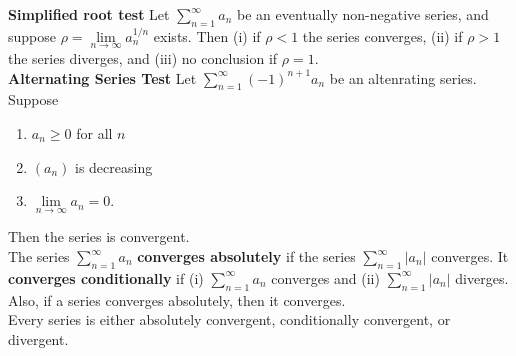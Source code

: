 \documentclass[10pt,landscape]{article}
\begin{document}
\begin{multicols}{3}
\textbf{Simplified root test} Let  $\sum_{n=1}^\infty a_n$ be an eventually non-negative series, and suppose  $\rho=\lim\limits_{n\to\infty} a_n^{1/n}$ exists. Then (i) if  $\rho<1$ the series converges, (ii) if  $\rho>1$ the series diverges, and (iii) no conclusion if $\rho=1$.\\
\textbf{Alternating Series Test} Let $\sum_{n=1}^\infty(-1)^{n+1}a_n$ be an altenrating series. Suppose
 \begin{enumerate}
	 \item $a_n\geq 0$ for all  $n$
	\item  $(a_n)$ is decreasing
	\item $\lim\limits_{n\to\infty}a_n=0$.
\end{enumerate} Then the series is convergent.\\
The series $\sum_{n=1}^\infty a_n$ \textbf{converges absolutely} if the series  $\sum_{n=1}^\infty|a_n|$ converges. It \textbf{converges conditionally} if (i)  $\sum_{n=1}^\infty a_n$ converges and (ii)  $\sum_{n=1}^\infty|a_n|$ diverges. Also, if a series converges absolutely, then it converges.\\
Every series is either absolutely convergent, conditionally convergent, or divergent.


\end{multicols}
\end{document}
